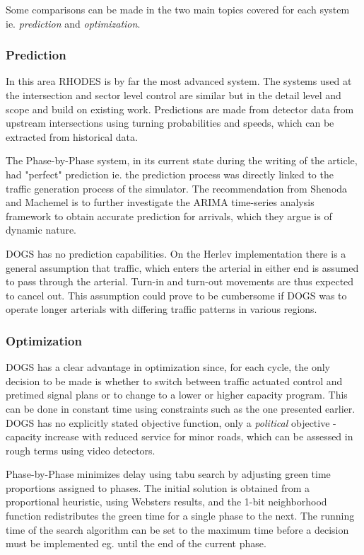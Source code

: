 Some comparisons can be made in the two main topics covered for each
system ie. \textit{prediction} and \textit{optimization}.

\subsubsection*{Prediction}

In this area RHODES is by far the most advanced system. The systems
used at the intersection and sector level control are similar but in
the detail level and scope and build on existing work. Predictions are
made from detector data from upstream intersections using turning
probabilities and speeds, which can be extracted from historical data.

The Phase-by-Phase system, in its current state during the writing of
the article, had "perfect" prediction ie. the prediction process was
directly linked to the traffic generation process of the
simulator. The recommendation from Shenoda and Machemel is to further
investigate the ARIMA time-series analysis framework to obtain
accurate prediction for arrivals, which they argue is of dynamic
nature.

DOGS has no prediction capabilities. On the Herlev implementation
there is a general assumption that traffic, which enters the arterial
in either end is assumed to pass through the arterial. Turn-in and
turn-out movements are thus expected to cancel out. This assumption
could prove to be cumbersome if DOGS was to operate longer arterials
with differing traffic patterns in various regions.

\subsubsection*{Optimization}

DOGS has a clear advantage in optimization since, for each cycle, the
only decision to be made is whether to switch between traffic actuated
control and pretimed signal plans or to change to a lower or higher
capacity program. This can be done in constant time using constraints
such as the one presented earlier. DOGS has no explicitly stated
objective function, only a \textit{political} objective - capacity
increase with reduced service for minor roads, which can be assessed
in rough terms using video detectors.

Phase-by-Phase minimizes delay using tabu search by adjusting green
time proportions assigned to phases. The initial solution is obtained
from a proportional heuristic, using Websters results, and the 1-bit
neighborhood function redistributes the green time for a single phase
to the next.  The running time of the search algorithm can be set to
the maximum time before a decision must be implemented eg. until the
end of the current phase.

